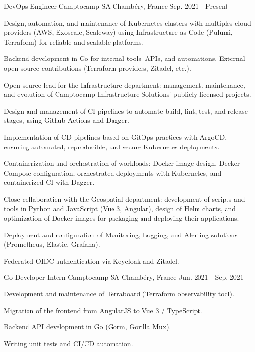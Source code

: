 \documentclass[11pt, a4paper]{awesome-cv}
\begin{document}
\begin{cventries}
  \cventry
    {DevOps Engineer}
    {Camptocamp SA}
    {Chambéry, France}
    {Sep. 2021 - Present}
    {
      \vspace{2.0mm}
      \begin{cvitems}
        \item {Design, automation, and maintenance of Kubernetes clusters with multiples cloud providers (AWS, Exoscale, Scaleway) using Infrastructure as Code (Pulumi, Terraform) for reliable and scalable platforms.}
        \item {Backend development in Go for internal tools, APIs, and automations. External open-source contributions (Terraform providers, Zitadel, etc.).}
        \item {Open-source lead for the Infrastructure department: management, maintenance, and evolution of Camptocamp Infrastructure Solutions' publicly licensed projects.}
        \item {Design and management of CI pipelines to automate build, lint, test, and release stages, using Github Actions and Dagger.}
        \item {Implementation of CD pipelines based on GitOps practices with ArgoCD, ensuring automated, reproducible, and secure Kubernetes deployments.}
        \item {Containerization and orchestration of workloads: Docker image design, Docker Compose configuration, orchestrated deployments with Kubernetes, and containerized CI with Dagger.}
        \item {Close collaboration with the Geospatial department: development of scripts and tools in Python and JavaScript (Vue 3, Angular), design of Helm charts, and optimization of Docker images for packaging and deploying their applications.}
        \item {Deployment and configuration of Monitoring, Logging, and Alerting solutions (Prometheus, Elastic, Grafana).}
        \item {Federated OIDC authentication via Keycloak and Zitadel.}
      \end{cvitems}
    }

  \cventry
    {Go Developer Intern}
    {Camptocamp SA}
    {Chambéry, France}
    {Jun. 2021 - Sep. 2021}
    {
      \vspace{2.0mm}
      \begin{cvitems}
        \item {Development and maintenance of Terraboard (Terraform observability tool).}
        \item {Migration of the frontend from AngularJS to Vue 3 / TypeScript.}
        \item {Backend API development in Go (Gorm, Gorilla Mux).}
        \item {Writing unit tests and CI/CD automation.}
      \end{cvitems}
    }


\end{cventries}
\end{document}
